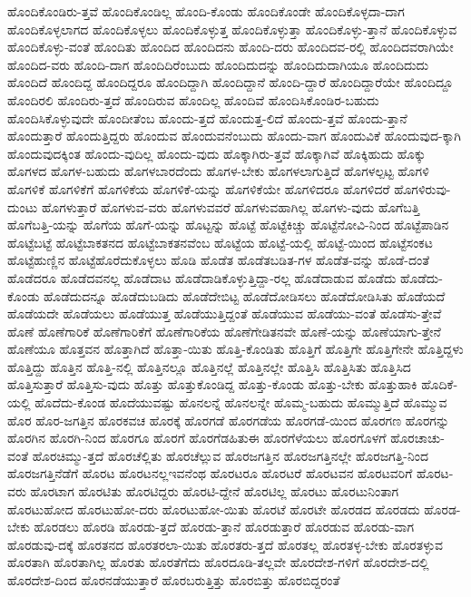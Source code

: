 {ಹೊಂದಿಕೊಂಡಿರು-ತ್ತವೆ
ಹೊಂದಿಕೊಂಡಿಲ್ಲ
ಹೊಂದಿ-ಕೊಂಡು
ಹೊಂದಿಕೊಂಡೇ
ಹೊಂದಿಕೊಳ್ಳದಾ-ದಾಗ
ಹೊಂದಿಕೊಳ್ಳಲಾಗದ
ಹೊಂದಿಕೊಳ್ಳಲು
ಹೊಂದಿಕೊಳ್ಳುತ್ತ
ಹೊಂದಿಕೊಳ್ಳುತ್ತಾ
ಹೊಂದಿಕೊಳ್ಳು-ತ್ತಾನೆ
ಹೊಂದಿಕೊಳ್ಳುವ
ಹೊಂದಿಕೊಳ್ಳು-ವಂತೆ
ಹೊಂದಿತು
ಹೊಂದಿದ
ಹೊಂದಿದನು
ಹೊಂದಿ-ದರು
ಹೊಂದಿದವ-ರಲ್ಲಿ
ಹೊಂದಿದವರಾಗಿಯೇ
ಹೊಂದಿದ-ವರು
ಹೊಂದಿ-ದಾಗ
ಹೊಂದಿದಿರೆಂಬುದು
ಹೊಂದಿದುದನ್ನು
ಹೊಂದಿದುದಾಗಿಯೂ
ಹೊಂದಿದುದು
ಹೊಂದಿದೆ
ಹೊಂದಿದ್ದ
ಹೊಂದಿದ್ದರೂ
ಹೊಂದಿದ್ದಾಗಿ
ಹೊಂದಿದ್ದಾನೆ
ಹೊಂದಿ-ದ್ದಾರೆ
ಹೊಂದಿದ್ದಾರೆಯೇ
ಹೊಂದಿದ್ದೂ
ಹೊಂದಿರಲಿ
ಹೊಂದಿರು-ತ್ತದೆ
ಹೊಂದಿರುವ
ಹೊಂದಿಲ್ಲ
ಹೊಂದಿವೆ
ಹೊಂದಿಸಿಕೊಂಡಿರ-ಬಹುದು
ಹೊಂದಿಸಿಕೊಳ್ಳುವುದೇ
ಹೊಂದೀತೆಂಬ
ಹೊಂದು-ತ್ತದೆ
ಹೊಂದುತ್ತ-ಲಿದೆ
ಹೊಂದು-ತ್ತವೆ
ಹೊಂದು-ತ್ತಾನೆ
ಹೊಂದುತ್ತಾರೆ
ಹೊಂದುತ್ತಿದ್ದರು
ಹೊಂದುವ
ಹೊಂದುವನೆಂಬುದು
ಹೊಂದು-ವಾಗ
ಹೊಂದುವಿಕೆ
ಹೊಂದುವುದ-ಕ್ಕಾಗಿ
ಹೊಂದುವುದಕ್ಕಿಂತ
ಹೊಂದು-ವುದಿಲ್ಲ
ಹೊಂದು-ವುದು
ಹೊಕ್ಕಾಗಿರು-ತ್ತವೆ
ಹೊಕ್ಕಾಗಿವೆ
ಹೊಕ್ಕಿಹುದು
ಹೊಕ್ಕು
ಹೊಗಳದ
ಹೊಗಳ-ಬಹುದು
ಹೊಗಳಬಾರದೆಂದು
ಹೊಗಳ-ಬೇಕು
ಹೊಗಳಲಾಗುತ್ತಿದೆ
ಹೊಗಳಲ್ಪಟ್ಟ
ಹೊಗಳಿ
ಹೊಗಳಿಕೆ
ಹೊಗಳಿಕೆಗೆ
ಹೊಗಳಿಕೆಯ
ಹೊಗಳಿಕೆ-ಯನ್ನು
ಹೊಗಳಿಕೆಯೇ
ಹೊಗಳಿದರೂ
ಹೊಗಳಿದರೆ
ಹೊಗಳಿರುವು-ದುಂಟು
ಹೊಗಳುತ್ತಾರೆ
ಹೊಗಳುವ-ವರು
ಹೊಗಳುವವರೆ
ಹೊಗಳುವಹಾಗಿಲ್ಲ
ಹೊಗಳು-ವುದು
ಹೊಗೆಬತ್ತಿ
ಹೊಗೆಬತ್ತಿ-ಯನ್ನು
ಹೊಗೆಯ
ಹೊಗೆ-ಯನ್ನು
ಹೊಟ್ಟನ್ನು
ಹೊಟ್ಟೆ
ಹೊಟ್ಟೆಕಿಚ್ಚು
ಹೊಟ್ಟೆನೋವಿ-ನಿಂದ
ಹೊಟ್ಟೆಪಾಡಿನ
ಹೊಟ್ಟೆಬಟ್ಟೆ
ಹೊಟ್ಟೆಬಾಕತನದ
ಹೊಟ್ಟೆಬಾಕತನವೆಂಬ
ಹೊಟ್ಟೆಯ
ಹೊಟ್ಟೆ-ಯಲ್ಲಿ
ಹೊಟ್ಟೆ-ಯಿಂದ
ಹೊಟ್ಟೆಸಂಕಟ
ಹೊಟ್ಟೆಹುಣ್ಣಿನ
ಹೊಟ್ಟೆಹೊರೆದುಕೊಳ್ಳಲು
ಹೊಡಿ
ಹೊಡೆತ
ಹೊಡೆತಬಡಿತ-ಗಳ
ಹೊಡೆತ-ವನ್ನು
ಹೊಡೆ-ದಂತೆ
ಹೊಡೆದರೂ
ಹೊಡೆದವನಲ್ಲ
ಹೊಡೆದಾಟ
ಹೊಡೆದಾಡಿಕೊಳ್ಳುತ್ತಿದ್ದಾ-ರಲ್ಲ
ಹೊಡೆದಾಡುವ
ಹೊಡೆದು
ಹೊಡೆದು-ಕೊಂಡು
ಹೊಡೆದುದನ್ನೂ
ಹೊಡೆದುಬಡಿದು
ಹೊಡೆದೇಬಿಟ್ಟ
ಹೊಡೆದೋಡಿಸಲು
ಹೊಡೆದೋಡಿಸಿತು
ಹೊಡೆಯದೆ
ಹೊಡೆಯದೇ
ಹೊಡೆಯಲು
ಹೊಡೆಯುತ್ತ
ಹೊಡೆಯುತ್ತಿದ್ದಂತೆ
ಹೊಡೆಯುವ
ಹೊಡೆಯು-ವಂತೆ
ಹೊಡೆಸು-ತ್ತೇವೆ
ಹೊಣೆ
ಹೊಣೆಗಾರಿಕೆ
ಹೊಣೆಗಾರಿಕೆಗೆ
ಹೊಣೆಗಾರಿಕೆಯ
ಹೊಣೆಗೇಡಿತನವೇ
ಹೊಣೆ-ಯನ್ನು
ಹೊಣೆಯಾಗು-ತ್ತೇನೆ
ಹೊಣೆಯೂ
ಹೊತ್ತವನ
ಹೊತ್ತಾಗಿದೆ
ಹೊತ್ತಾ-ಯಿತು
ಹೊತ್ತಿ-ಕೊಂಡಿತು
ಹೊತ್ತಿಗೆ
ಹೊತ್ತಿಗೇ
ಹೊತ್ತಿಗೇನೇ
ಹೊತ್ತಿದ್ದಳು
ಹೊತ್ತಿದ್ದು
ಹೊತ್ತಿನ
ಹೊತ್ತಿ-ನಲ್ಲಿ
ಹೊತ್ತಿನಲ್ಲೂ
ಹೊತ್ತಿನಲ್ಲೆ
ಹೊತ್ತಿನಲ್ಲೇ
ಹೊತ್ತಿಸಿ
ಹೊತ್ತಿಸಿತು
ಹೊತ್ತಿಸಿದ
ಹೊತ್ತಿಸುತ್ತಾರೆ
ಹೊತ್ತಿಸು-ವುದು
ಹೊತ್ತು
ಹೊತ್ತುಕೊಂಡಿದ್ದ
ಹೊತ್ತು-ಕೊಂಡು
ಹೊತ್ತು-ಬೇಕು
ಹೊತ್ತುಹಾಕಿ
ಹೊದಿಕೆ-ಯಲ್ಲಿ
ಹೊದೆದು-ಕೊಂಡ
ಹೊದೆಯುವಷ್ಟು
ಹೊನಲನ್ನೆ
ಹೊನಲನ್ನೇ
ಹೊಮ್ಮ-ಬಹುದು
ಹೊಮ್ಮುತ್ತಿದೆ
ಹೊಮ್ಮುವ
ಹೊರ
ಹೊರ-ಜಗತ್ತಿನ
ಹೊರಕವಚ
ಹೊರಕ್ಕೆ
ಹೊರಗಡೆ
ಹೊರಗಡೆಯ
ಹೊರಗಡೆ-ಯಿಂದ
ಹೊರಗಣ
ಹೊರಗನ್ನು
ಹೊರಗಿನ
ಹೊರಗಿ-ನಿಂದ
ಹೊರಗೂ
ಹೊರಗೆ
ಹೊರಗೆಡಹಿತುಈ
ಹೊರಗೆಳೆಯಲು
ಹೊರಗೊಳಗೆ
ಹೊರಚಾಚು-ವಂತೆ
ಹೊರಚಿಮ್ಮು-ತ್ತದೆ
ಹೊರಚೆಲ್ಲಿತು
ಹೊರಚೆಲ್ಲುವ
ಹೊರಜಗತ್ತಿನ
ಹೊರಜಗತ್ತಿನಲ್ಲೇ
ಹೊರಜಗತ್ತಿ-ನಿಂದ
ಹೊರಜಗತ್ತಿನೆಡೆಗೆ
ಹೊರಟ
ಹೊರಟನಲ್ಲಇವನೆಂಥ
ಹೊರಟರೂ
ಹೊರಟರೆ
ಹೊರಟವನ
ಹೊರಟವರಿಗೆ
ಹೊರಟ-ವರು
ಹೊರಟಾಗ
ಹೊರಟಿತು
ಹೊರಟಿದ್ದರು
ಹೊರಟಿ-ದ್ದೇನೆ
ಹೊರಟಿಲ್ಲ
ಹೊರಟು
ಹೊರಟುನಿಂತಾಗ
ಹೊರಟುಹೋದ
ಹೊರಟುಹೋ-ದರು
ಹೊರಟುಹೋ-ಯಿತು
ಹೊರಟೆ
ಹೊರಟೇ
ಹೊರಡದ
ಹೊರಡದು
ಹೊರಡ-ಬೇಕು
ಹೊರಡಲು
ಹೊರಡಿ
ಹೊರಡು-ತ್ತದೆ
ಹೊರಡು-ತ್ತಾನೆ
ಹೊರಡುತ್ತಾರೆ
ಹೊರಡುವ
ಹೊರಡು-ವಾಗ
ಹೊರಡುವು-ದಕ್ಕೆ
ಹೊರತನದ
ಹೊರತರಲಾ-ಯಿತು
ಹೊರತರು-ತ್ತದೆ
ಹೊರತಲ್ಲ
ಹೊರತಳ್ಳ-ಬೇಕು
ಹೊರತಳ್ಳುವ
ಹೊರತಾಗಿ
ಹೊರತಾಗಿಲ್ಲ
ಹೊರತು
ಹೊರತೆಗೆದು
ಹೊರದೂಡಿ-ತಲ್ಲವೇ
ಹೊರದೇಶ-ಗಳಿಗೆ
ಹೊರದೇಶ-ದಲ್ಲಿ
ಹೊರದೇಶ-ದಿಂದ
ಹೊರನಡೆಯುತ್ತಾರೆ
ಹೊರಬರುತ್ತಿತ್ತು
ಹೊರಬಿತ್ತು
ಹೊರಬಿದ್ದರಂತೆ
}
